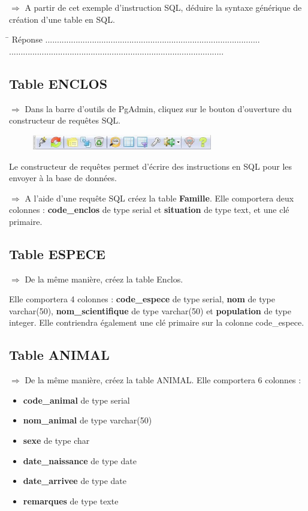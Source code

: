 \documentclass[11pt]{article}
\newcommand{\action}{$\Rightarrow$ }
\newcommand{\reponse}{\begin{tabbing}
\hspace{2cm}\=\kill
Réponse \> ............................................................................................ \\ 
 \> ............................................................................................
\end{tabbing}
}
\begin{document}
\action A partir de cet exemple d'instruction SQL, déduire la syntaxe générique de création d'une table en SQL.
			
\reponse
			
\subsection{Table ENCLOS}
\action Dans la barre d'outils de PgAdmin, cliquez sur le bouton d'ouverture du constructeur de requêtes SQL.
\begin{figure}[H]
	\center \includegraphics[width=0.7\textwidth]{img/pgadmin_barre_outils.jpg}\\[1em]
\end{figure}
 
Le constructeur de requêtes permet d'écrire des instructions en SQL pour les envoyer à la base de données.

\action A l'aide d'une requête SQL créez la table \textbf{Famille}. Elle comportera deux colonnes : \textbf{code\_enclos} de type serial et \textbf{situation} de type text, et une clé primaire.

\subsection{Table ESPECE}
\action De la même manière, créez la table Enclos. 

Elle comportera 4 colonnes : \textbf{code\_espece} de type serial, \textbf{nom} de type varchar(50), \textbf{nom\_scientifique} de type varchar(50) et \textbf{population} de type integer. Elle contriendra également une clé primaire sur la colonne code\_espece.


\subsection{Table ANIMAL}
\action De la même manière, créez la table ANIMAL. Elle comportera 6 colonnes :
\begin{itemize}
	\item \textbf{code\_animal} de type serial
	\item \textbf{nom\_animal} de type varchar(50) 
	\item \textbf{sexe} de type char
	\item \textbf{date\_naissance} de type date
	\item \textbf{date\_arrivee} de type date
	\item \textbf{remarques} de type texte
\end{itemize}
\end{document}
